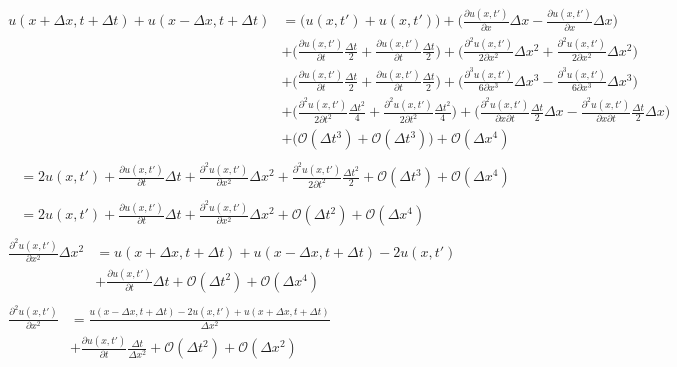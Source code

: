 \documentclass{article}
\begin{document}
\begin{subequations}
	\begin{align}
		\begin{split}
		u(x+\Delta x, t+\Delta t) + u(x-\Delta x,t + \Delta t) &= 
		\Big(u(x,t') + u(x,t') \Big) + \Big(\frac{\partial u(x,t')}{\partial x}\Delta x-\frac{\partial u(x,t')}{\partial x}\Delta x\Big)\\ 
		&+ \Big(\frac{\partial u(x,t')}{\partial t} \frac{\Delta t}{2} +\frac{\partial u(x,t')}{\partial t} \frac{\Delta t}{2} \Big) + \Big(\frac{\partial^2 u(x,t')}{2\partial x^2}\Delta x^2+\frac{\partial^2 u(x,t')}{2\partial x^2}\Delta x^2\Big)\\
		&+ \Big(\frac{\partial u(x,t')}{\partial t} \frac{\Delta t}{2} +\frac{\partial u(x,t')}{\partial t} \frac{\Delta t}{2} \Big) + \Big(\frac{\partial^3 u(x,t')}{6\partial x^3}\Delta x^3-\frac{\partial^3 u(x,t')}{6\partial x^3}\Delta x^3\Big)\\
		& + \Big(\frac{\partial^2 u(x,t')}{2\partial t^2}\frac{\Delta t^2}{4} +\frac{\partial^2 u(x,t')}{2\partial t^2}\frac{\Delta t^2}{4} \Big) + \Big(\frac{\partial^2 u(x,t')}{\partial x\partial t}\frac{\Delta t}{2} \Delta x - \frac{\partial^2 u(x,t')}{\partial x\partial t}\frac{\Delta t}{2} \Delta x\Big)\\
		& + \Big(\mathcal{O}(\Delta t^3) + \mathcal{O}(\Delta t^3) \Big) + \mathcal{O}(\Delta x^4)
		\end{split}\\
		\begin{split}
			&=2u(x,t') + \frac{\partial u(x,t')}{\partial t} \Delta t
			+ \frac{\partial^2 u(x,t')}{\partial x^2}\Delta x^2
			 + \frac{\partial^2 u(x,t')}{2\partial t^2}\frac{\Delta t^2}{2}  
			 + \mathcal{O}(\Delta t^3) + \mathcal{O}(\Delta x^4)
		\end{split}\\
		\begin{split}
			&=2u(x,t') + \frac{\partial u(x,t')}{\partial t} \Delta t
			+ \frac{\partial^2 u(x,t')}{\partial x^2}\Delta x^2			
			+ \mathcal{O}(\Delta t^2) + \mathcal{O}(\Delta x^4)
		\end{split}\\	
		\begin{split}
		\frac{\partial^2 u(x,t')}{\partial x^2}\Delta x^2
		& = 
		u(x+\Delta x, t+\Delta t) + u(x-\Delta x,t + \Delta t) 
		- 2u(x,t') 
			\\ 
		&+\frac{\partial u(x,t')}{\partial t} \Delta t
		+  \mathcal{O}(\Delta t^2) + \mathcal{O}(\Delta x^4)
		\end{split}\\
		\begin{split}
			\frac{\partial^2 u(x,t')}{\partial x^2}
			&=\frac{u(x-\Delta x,t+ \Delta t)  - 2u(x,t') +  	u(x+\Delta x, t+\Delta t)}{\Delta x^2}\\
			& +\frac{\partial u(x,t')}{\partial t} \frac{\Delta t}{\Delta x^2} +\mathcal{O}(\Delta t^2) + \mathcal{O}(\Delta x^2)\label{eq:cnX2}
		\end{split}		
	\end{align}
\end{subequations}
\end{document}
